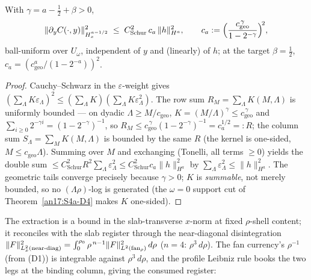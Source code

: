 \begin{theorem}
\label{an17:S4b-D5}
With $\gamma=a-\tfrac12+\beta>0$,
\begin{equation}\label{an17:eq-D5}
 \|\partial_yC(\cdot,y)\|^2_{H^{a-1/2}_x}\;\le\;C_{\mathrm{Schur}}^2\,c_a\,
 \|h\|_{H^a}^2,\qquad
 c_a:=\Bigl(\frac{c_{\mathrm{geo}}^{\,\gamma}}{1-2^{-\gamma}}\Bigr)^{\!2},
\end{equation}
ball-uniform over $U_\omega$, independent of $y$ and (linearly) of $h$; at the
target $\beta=\tfrac12$, $c_a=(c_{\mathrm{geo}}^{a}/(1-2^{-a}))^2$.
\end{theorem}
\begin{proof}
Cauchy--Schwarz in the $\varepsilon$-weight gives $(\sum_\Lambda K\varepsilon_
\Lambda)^2\le(\sum_\Lambda K)(\sum_\Lambda K\varepsilon_\Lambda^2)$. The row sum
$R_M=\sum_\Lambda K(M,\Lambda)$ is uniformly bounded --- on dyadic $\Lambda\ge
M/c_{\mathrm{geo}}$, $K=(M/\Lambda)^\gamma\le c_{\mathrm{geo}}^{\,\gamma}$ and
$\sum_{i\ge0}2^{-\gamma i}=(1-2^{-\gamma})^{-1}$, so $R_M\le
c_{\mathrm{geo}}^{\,\gamma}(1-2^{-\gamma})^{-1}=c_a^{1/2}=:R$; the column sum
$S_\Lambda=\sum_M K(M,\Lambda)$ is bounded by the same $R$ (the kernel is
one-sided, $M\le c_{\mathrm{geo}}\Lambda$). Summing over $M$ and exchanging
(Tonelli, all terms $\ge0$) yields the double sum $\le C_{\mathrm{Schur}}^2R^2
\sum_\Lambda\varepsilon_\Lambda^2\le C_{\mathrm{Schur}}^2c_a\|h\|_{H^a}^2$ by
$\sum_\Lambda\varepsilon_\Lambda^2\le\|h\|_{H^a}^2$. The geometric tails converge
precisely because $\gamma>0$; $K$ is \emph{summable}, not merely bounded, so no
$(\Lambda\rho)$-log is generated (the $\omega=0$ support cut of
Theorem~\ref{an17:S4a-D4} makes $K$ one-sided).
\end{proof}

The extraction is a bound in the slab-transverse $x$-norm at fixed $\rho$-shell
content; it reconciles with the slab register through the near-diagonal
disintegration $\|F\|^2_{L^2_x(\mathrm{near\text-diag})}=\int_0^{\rho_0}
\rho^{\,n-1}\|F\|^2_{L^2(\mathrm{fan}_\rho)}\,d\rho$ ($n=4$: $\rho^3\,d\rho$). The
fan currency's $\rho^{-1}$ (from (D1)) is integrable against $\rho^3\,d\rho$, and
the profile Leibniz rule books the two legs at the binding column, giving the
consumed register:

